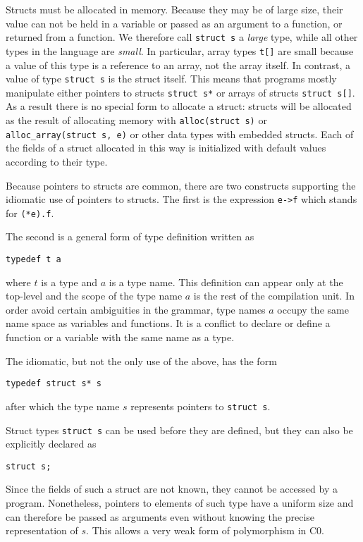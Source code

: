 \documentclass[11pt]{article}
\begin{document}
Structs must be allocated in memory.  Because they may be of large
size, their value can not be held in a variable or passed as an
argument to a function, or returned from a function.  We therefore
call \verb'struct s' a \emph{large} type, while all other types
in the language are \emph{small}.  In particular, array types
\verb't[]' are small because a value of this type is a reference
to an array, not the array itself.  In contrast, a value of type
\verb'struct s' is the struct itself.  This means that programs
mostly manipulate either pointers to structs \verb'struct s*'
or arrays of structs \verb'struct s[]'.  As a result there is
no special form to allocate a struct: structs will be allocated
as the result of allocating memory with \verb'alloc(struct s)' or
\verb'alloc_array(struct s, e)' or other data types with embedded
structs.  Each of the fields of a struct allocated in this way
is initialized with default values according to their type.

Because pointers to structs are common, there are two constructs
supporting the idiomatic use of pointers to structs.  The first
is the expression \verb'e->f' which stands for \verb'(*e).f'.

The second is a general form of type definition written as
\begin{verbatim}
typedef t a
\end{verbatim}
where $t$ is a type and $a$ is a type name.  This definition can
appear only at the top-level and the scope of the type name
$a$ is the rest of the compilation unit.  In order avoid certain
ambiguities in the grammar, type names $a$ occupy the same
name space as variables and functions.  It is a conflict to
declare or define a function or a variable with the same name
as a type.

The idiomatic, but not the only use of the above, has the form
\begin{verbatim}
typedef struct s* s
\end{verbatim}
after which the type name $s$ represents pointers
to \verb'struct s'.

Struct types \verb'struct s' can be used before they are defined,
but they can also be explicitly declared as
\begin{verbatim}
struct s;
\end{verbatim}
Since the fields of such a struct are not known, they cannot
be accessed by a program.  Nonetheless, pointers to elements
of such type have a uniform size and can therefore be passed
as arguments even without knowing the precise representation
of $s$.  This allows a very weak form of polymorphism in C0.
\end{document}
